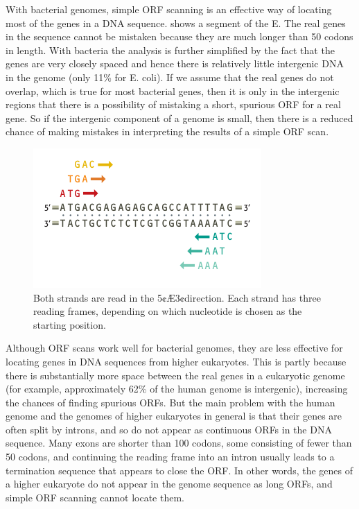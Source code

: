 With bacterial genomes, simple ORF scanning is an effective way of locating most of the genes in a DNA sequence. shows a segment of the E. The real genes
in the sequence cannot be mistaken because they are much longer than 50 codons in length. With bacteria the analysis is further simplified by the fact
that the genes are very closely spaced and hence there is relatively little intergenic DNA in the genome (only 11\% for E. coli). If we assume that the 
real genes do not overlap, which is true for most bacterial genes, then it is only in the intergenic regions that there is a possibility of mistaking a short, 
spurious ORF for a real gene. So if the intergenic component of a genome is small, then there is a reduced chance of making mistakes in 
interpreting the results of a simple ORF scan. 

\begin{figure}[!ht]
	\centering
	\includegraphics[width=.9\textwidth]{figures/ORF2.png}
	\caption{Both
	strands are read in the 5¢Æ3¢direction. Each
	strand has three reading frames, depending
	on which nucleotide is chosen as the
	starting position.\label{o:latex_friendly_zone}}
\end{figure}

Although ORF scans work well for bacterial genomes, they are less effective for locating genes in DNA sequences from higher eukaryotes. This is partly
because there is substantially more space between the real genes in a eukaryotic genome (for example, approximately 62\% of the human genome is intergenic), 
increasing the chances of finding spurious ORFs. But the main problem with the human genome and the genomes of higher eukaryotes in general is that their 
genes are often split by introns, and so do not appear as continuous ORFs in the DNA sequence. Many exons are shorter than 100 codons, some consisting of 
fewer than 50 codons, and continuing the reading frame into an intron usually leads to a termination sequence that appears to close the ORF. In other words, 
the genes of a higher eukaryote do not appear in the genome sequence as long ORFs, and simple ORF scanning cannot locate them.

